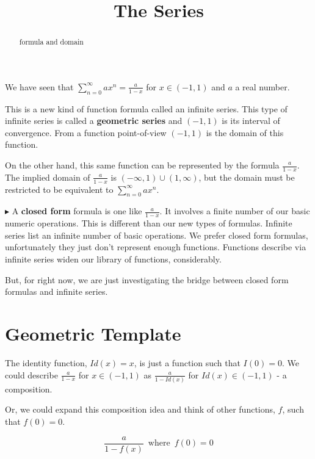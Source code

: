 \documentclass{ximera}
\title{The Series}
\begin{document}
\begin{abstract}
formula and domain
\end{abstract}
\maketitle




We have seen that $\sum_{n=0}^{\infty} a x^n = \frac{a}{1-x}$ for $x \in (-1, 1)$ and $a$ a real number.


This is a new kind of function formula called an infinite series.  This type of infinite series is called a \textbf{geometric series} and $(-1, 1)$ is its interval of convergence.  From a function point-of-view $(-1, 1)$  is the domain of this function.


On the other hand, this same function can be represented by the formula $\frac{a}{1-x}$.  The implied domain of $\frac{a}{1-x}$ is $(-\infty, 1) \cup (1, \infty)$, but the domain must be restricted to be equivalent to $\sum_{n=0}^{\infty} a x^n$.




$\blacktriangleright$ A \textbf{closed form} formula is one like  $\frac{a}{1-x}$.  It involves a finite number of our basic numeric operations.  This is different than our new types of formulas.  Infinite series list an infinite number of basic operations.  We prefer closed form formulas, unfortunately they just don't represent enough functions. Functions describe via infinite series widen our library of functions, considerably.

But, for right now, we are just investigating the bridge between closed form formulas and infinite series.






\section{Geometric Template}

The identity function, $Id(x) = x$, is just a function such that $I(0) = 0$.  We could describe $\frac{a}{1-x}$ for $x \in (-1, 1)$ as $\frac{a}{1-Id(x)}$ for $Id(x) \in (-1, 1)$ - a composition.

Or, we could expand this composition idea and think of other functions, $f$, such that $f(0) = 0$.



\[    \frac{a}{1-f(x)}   \, \text{ where } \, f(0) = 0       \]
\end{document}
